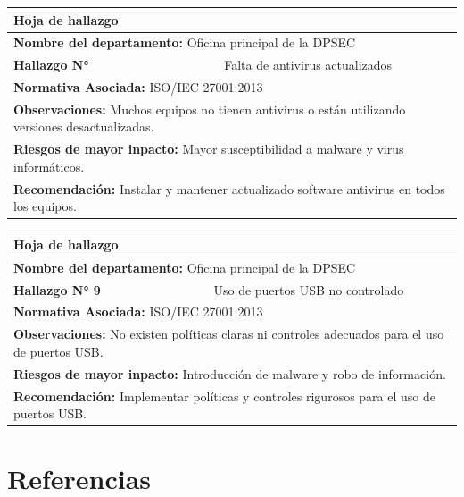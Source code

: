 \documentclass[12pt,a4paper]{article}
\begin{document}
    \par
    \begin{tabular}{ |p{4cm}|p{4cm}|p{4cm}|  }
        \hline  
        \multicolumn{3}{|l|}{\textbf{Hoja de hallazgo}} \\
        \hline
        \multicolumn{3}{|l|}{\textbf{Nombre del departamento: } Oficina principal de la DPSEC} \\
        \hline
        \textbf{Hallazgo N° }  & \multicolumn{2}{|c|}{ Falta de antivirus actualizados } \\
        \hline
        \multicolumn{3}{|l|}{\textbf{Normativa Asociada: } ISO/IEC 27001:2013 } \\
        \hline
        \multicolumn{3}{|l|}{\textbf{Observaciones: } Muchos equipos no tienen antivirus o están utilizando versiones desactualizadas. } \\
        \hline
        \multicolumn{3}{|l|}{\textbf{Riesgos de mayor inpacto: } Mayor susceptibilidad a malware y virus informáticos. } \\
        \hline
        \multicolumn{3}{|l|}{\textbf{Recomendación: } Instalar y mantener actualizado software antivirus en todos los equipos. } \\
        \hline
    \end{tabular}
    \par
    \begin{tabular}{ |p{4cm}|p{4cm}|p{4cm}|  }
        \hline  
        \multicolumn{3}{|l|}{\textbf{Hoja de hallazgo}} \\
        \hline
        \multicolumn{3}{|l|}{\textbf{Nombre del departamento: } Oficina principal de la DPSEC} \\
        \hline
        \textbf{Hallazgo N° 9}  & \multicolumn{2}{|c|}{ Uso de puertos USB no controlado } \\
        \hline
        \multicolumn{3}{|l|}{\textbf{Normativa Asociada: } ISO/IEC 27001:2013 } \\
        \hline
        \multicolumn{3}{|l|}{\textbf{Observaciones: } No existen políticas claras ni controles adecuados para el uso de puertos USB. } \\
        \hline
        \multicolumn{3}{|l|}{\textbf{Riesgos de mayor inpacto: } Introducción de malware y robo de información. } \\
        \hline
        \multicolumn{3}{|l|}{\textbf{Recomendación: } Implementar políticas y controles rigurosos para el uso de puertos USB. } \\
        \hline
    \end{tabular}


\newpage
\cite{prueba}

\section{Referencias}


\end{document}
